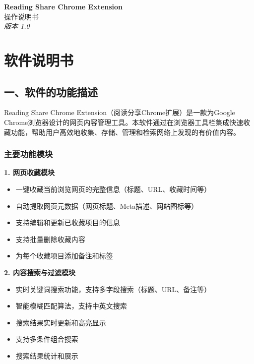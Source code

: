 \documentclass[10pt,a4paper]{article}
\begin{document}
\begin{center}
{\Large\bfseries Reading Share Chrome Extension}\\
\vspace{2pt}
{\large 操作说明书}\\
\vspace{3pt}
\textit{版本 1.0}
\end{center}

\vspace{10pt}

\newpage
\section*{软件说明书}

\subsection*{一、软件的功能描述}

Reading Share Chrome Extension（阅读分享Chrome扩展）是一款为Google Chrome浏览器设计的网页内容管理工具。本软件通过在浏览器工具栏集成快速收藏功能，帮助用户高效地收集、存储、管理和检索网络上发现的有价值内容。

\subsubsection*{主要功能模块}

\textbf{1. 网页收藏模块}
\begin{itemize}
  \item 一键收藏当前浏览网页的完整信息（标题、URL、收藏时间等）
  \item 自动提取网页元数据（网页标题、Meta描述、网站图标等）
  \item 支持编辑和更新已收藏项目的信息
  \item 支持批量删除收藏内容
  \item 为每个收藏项目添加备注和标签
\end{itemize}

\textbf{2. 内容搜索与过滤模块}
\begin{itemize}
  \item 实时关键词搜索功能，支持多字段搜索（标题、URL、备注等）
  \item 智能模糊匹配算法，支持中英文搜索
  \item 搜索结果实时更新和高亮显示
  \item 支持多条件组合搜索
  \item 搜索结果统计和展示
\end{itemize}
\end{document}
